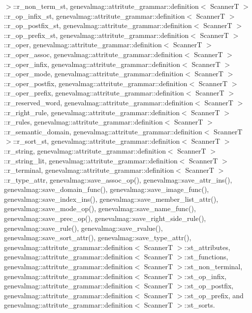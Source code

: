 $>$::r\_\-non\_\-term\_\-st, genevalmag::attritute\_\-grammar::definition$<$ ScannerT $>$::r\_\-op\_\-infix\_\-st, genevalmag::attritute\_\-grammar::definition$<$ ScannerT $>$::r\_\-op\_\-postfix\_\-st, genevalmag::attritute\_\-grammar::definition$<$ ScannerT $>$::r\_\-op\_\-prefix\_\-st, genevalmag::attritute\_\-grammar::definition$<$ ScannerT $>$::r\_\-oper, genevalmag::attritute\_\-grammar::definition$<$ ScannerT $>$::r\_\-oper\_\-assoc, genevalmag::attritute\_\-grammar::definition$<$ ScannerT $>$::r\_\-oper\_\-infix, genevalmag::attritute\_\-grammar::definition$<$ ScannerT $>$::r\_\-oper\_\-mode, genevalmag::attritute\_\-grammar::definition$<$ ScannerT $>$::r\_\-oper\_\-postfix, genevalmag::attritute\_\-grammar::definition$<$ ScannerT $>$::r\_\-oper\_\-prefix, genevalmag::attritute\_\-grammar::definition$<$ ScannerT $>$::r\_\-reserved\_\-word, genevalmag::attritute\_\-grammar::definition$<$ ScannerT $>$::r\_\-right\_\-rule, genevalmag::attritute\_\-grammar::definition$<$ ScannerT $>$::r\_\-rules, genevalmag::attritute\_\-grammar::definition$<$ ScannerT $>$::r\_\-semantic\_\-domain, genevalmag::attritute\_\-grammar::definition$<$ ScannerT $>$::r\_\-sort\_\-st, genevalmag::attritute\_\-grammar::definition$<$ ScannerT $>$::r\_\-string, genevalmag::attritute\_\-grammar::definition$<$ ScannerT $>$::r\_\-string\_\-lit, genevalmag::attritute\_\-grammar::definition$<$ ScannerT $>$::r\_\-terminal, genevalmag::attritute\_\-grammar::definition$<$ ScannerT $>$::r\_\-type\_\-attr, genevalmag::save\_\-assoc\_\-op(), genevalmag::save\_\-attr\_\-ins(), genevalmag::save\_\-domain\_\-func(), genevalmag::save\_\-image\_\-func(), genevalmag::save\_\-index\_\-ins(), genevalmag::save\_\-member\_\-list\_\-attr(), genevalmag::save\_\-mode\_\-op(), genevalmag::save\_\-name\_\-func(), genevalmag::save\_\-prec\_\-op(), genevalmag::save\_\-right\_\-side\_\-rule(), genevalmag::save\_\-rule(), genevalmag::save\_\-rvalue(), genevalmag::save\_\-sort\_\-attr(), genevalmag::save\_\-type\_\-attr(), genevalmag::attritute\_\-grammar::definition$<$ ScannerT $>$::st\_\-attributes, genevalmag::attritute\_\-grammar::definition$<$ ScannerT $>$::st\_\-functions, genevalmag::attritute\_\-grammar::definition$<$ ScannerT $>$::st\_\-non\_\-terminal, genevalmag::attritute\_\-grammar::definition$<$ ScannerT $>$::st\_\-op\_\-infix, genevalmag::attritute\_\-grammar::definition$<$ ScannerT $>$::st\_\-op\_\-postfix, genevalmag::attritute\_\-grammar::definition$<$ ScannerT $>$::st\_\-op\_\-prefix, and genevalmag::attritute\_\-grammar::definition$<$ ScannerT $>$::st\_\-sorts.



